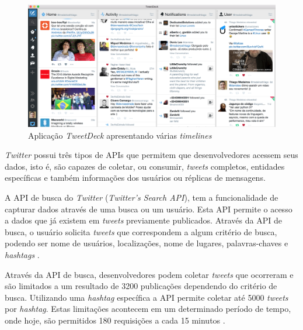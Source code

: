 \begin{figure}[h]
  \centering
  \includegraphics[width=1\textwidth]{Cap4/imagens/tweet-deck}
  \caption{Aplicação \textit{TweetDeck} apresentando várias \textit{timelines}}
  \label{fig:tweet-deck}
\end{figure}


\textit{Twitter} possui três tipos de APIs que permitem que desenvolvedores acessem seus dados, isto é, são capazes de coletar, ou consumir, \textit{tweets} completos, entidades específicas e também informações dos usuários ou réplicas de mensagens.

A API de busca do \textit{Twitter} (\textit{Twitter's Search API}), tem a funcionalidade de capturar dados através de uma busca ou um usuário. Esta API permite o acesso a dados que já existem em \textit{tweets} previamente publicados. Através da API de busca, o usuário solicita \textit{tweets} que correspondem a algum critério de busca, podendo ser nome de usuários, localizações, nome de lugares, palavras-chaves e \textit{hashtags} \cite{twitter-doc}.

Através da API de busca, desenvolvedores podem coletar \textit{tweets} que ocorreram e são limitados a um resultado de 3200 publicações dependendo do critério de busca. Utilizando uma \textit{hashtag} específica a API permite coletar até 5000 \textit{tweets} por \textit{hashtag}. Estas limitações acontecem em um determinado período de tempo, onde hoje, são permitidos 180 requisições a cada 15 minutos \cite{twitter-doc}.

